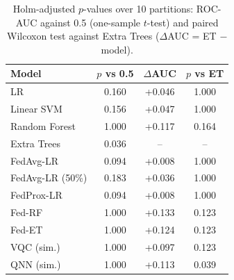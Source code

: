 \begin{table}[!t]\centering\caption{Holm-adjusted $p$-values over 10 partitions: ROC-AUC against 0.5 (one-sample $t$-test) and paired Wilcoxon test against Extra Trees ($\Delta$AUC = ET $-$ model).}\label{tab:stats}\scriptsize\setlength{\tabcolsep}{4pt}\begin{tabular}{lccc}\toprule Model & $p$ vs 0.5 & $\Delta$AUC & $p$ vs ET\\\midrule
LR & 0.160 & +0.046 & 1.000\\
Linear SVM & 0.156 & +0.047 & 1.000\\
Random Forest & 1.000 & +0.117 & 0.164\\
Extra Trees & 0.036 & -- & --\\
FedAvg-LR & 0.094 & +0.008 & 1.000\\
FedAvg-LR (50\%) & 0.183 & +0.036 & 1.000\\
FedProx-LR & 0.094 & +0.008 & 1.000\\
Fed-RF & 1.000 & +0.133 & 0.123\\
Fed-ET & 1.000 & +0.124 & 0.123\\
VQC (sim.) & 1.000 & +0.097 & 0.123\\
QNN (sim.) & 1.000 & +0.113 & 0.039\\
\bottomrule\end{tabular}\end{table}
